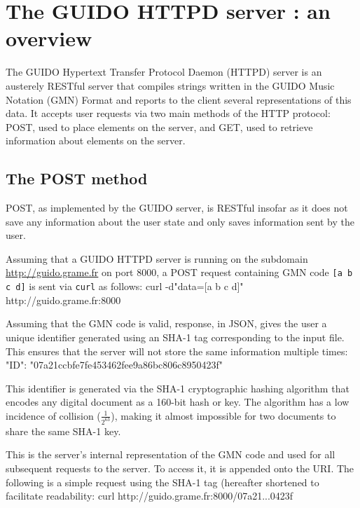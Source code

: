 \documentclass[11pt,a4paper]{article}
\newenvironment{code}		{\vspace{-2mm} \fontsize{8.5pt}{12pt}\selectfont \verbatim}{\endverbatim\vspace{-2mm}}
\begin{document}
\section{The GUIDO HTTPD server : an overview}\label{section:overview}
The GUIDO Hypertext Transfer Protocol Daemon (HTTPD) server is an austerely RESTful server that compiles strings written in the GUIDO Music Notation (GMN) Format and reports to the client several representations of this data.  It accepts user requests via two main methods of the HTTP protocol: POST, used to place elements on the server, and GET, used to retrieve information about elements on the server.

\subsection{The POST method}\label{subsection:post}
POST, as implemented by the GUIDO server, is RESTful insofar as it does not save any information about the user state and only saves information sent by the user.\par
Assuming that a GUIDO HTTPD server is running on the subdomain \url{http://guido.grame.fr} on port 8000, a POST request containing GMN code \verb=[a b c d]= is sent via \verb=curl= as follows:
\begin{code}
 curl -d"data=[a b c d]" http://guido.grame.fr:8000
\end{code}

Assuming that the GMN code is valid, response, in JSON, gives the user a unique identifier generated using an SHA-1 tag corresponding to the input file.  This ensures that the server will not store the same information multiple times:
\begin{code}
 {
  "ID": "07a21ccbfe7fe453462fee9a86bc806c8950423f"
 }
\end{code}

This identifier is generated via the SHA-1 cryptographic hashing algorithm \cite{sha1} that encodes any digital document as a 160-bit hash or key.  The algorithm has a low incidence of collision ($\frac{1}{2^{63}}$), making it almost impossible for two documents to share the same SHA-1 key.\par
This is the server's internal representation of the GMN code and used for all subsequent requests to the server.  To access it, it is appended onto the URI.  The following is a simple request using the SHA-1 tag (hereafter shortened to facilitate readability:
\begin{code}
   curl http://guido.grame.fr:8000/07a21...0423f
\end{code}
\end{document}
